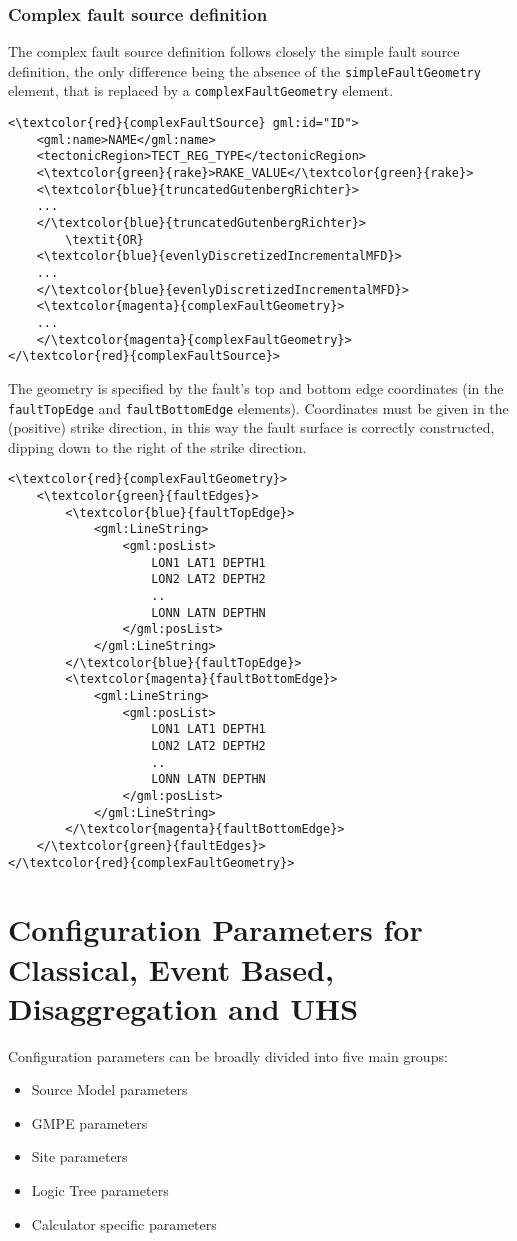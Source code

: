 \subsubsection{Complex fault source definition}
The complex fault source definition follows closely the simple fault source definition, the only difference being the absence of the \Verb+simpleFaultGeometry+ element, that is replaced by a \Verb+complexFaultGeometry+ element.
\begin{Verbatim}[frame=single, commandchars=\\\{\},fontsize=\normalsize, samepage=true]
<\textcolor{red}{complexFaultSource} gml:id="ID">
	<gml:name>NAME</gml:name>
	<tectonicRegion>TECT_REG_TYPE</tectonicRegion>
	<\textcolor{green}{rake}>RAKE_VALUE</\textcolor{green}{rake}>
	<\textcolor{blue}{truncatedGutenbergRichter}>
	...
	</\textcolor{blue}{truncatedGutenbergRichter}>
		\textit{OR}
	<\textcolor{blue}{evenlyDiscretizedIncrementalMFD}>
	...
	</\textcolor{blue}{evenlyDiscretizedIncrementalMFD}>
	<\textcolor{magenta}{complexFaultGeometry}>
	...
	</\textcolor{magenta}{complexFaultGeometry}>
</\textcolor{red}{complexFaultSource}>
\end{Verbatim}
The geometry is specified by the fault's top and bottom edge coordinates (in the \Verb+faultTopEdge+ and \Verb+faultBottomEdge+ elements). Coordinates must be given in the (positive) strike direction, in this way the fault surface is correctly constructed, dipping down to the right of the strike direction.
\begin{Verbatim}[frame=single, commandchars=\\\{\},fontsize=\normalsize, samepage=true]
<\textcolor{red}{complexFaultGeometry}>
	<\textcolor{green}{faultEdges}>
		<\textcolor{blue}{faultTopEdge}>
			<gml:LineString>
				<gml:posList>
					LON1 LAT1 DEPTH1
					LON2 LAT2 DEPTH2
					..
					LONN LATN DEPTHN
				</gml:posList>
			</gml:LineString>
		</\textcolor{blue}{faultTopEdge}>
		<\textcolor{magenta}{faultBottomEdge}>
			<gml:LineString>
				<gml:posList>
					LON1 LAT1 DEPTH1
					LON2 LAT2 DEPTH2
					..
					LONN LATN DEPTHN
				</gml:posList>
			</gml:LineString>
		</\textcolor{magenta}{faultBottomEdge}>
	</\textcolor{green}{faultEdges}>
</\textcolor{red}{complexFaultGeometry}>
\end{Verbatim}

\section{Configuration Parameters for Classical, Event Based, Disaggregation and UHS}
Configuration parameters can be broadly divided into five main groups:
\begin{itemize}
\item Source Model parameters
\item GMPE parameters
\item Site parameters
\item Logic Tree parameters
\item Calculator specific parameters
\end{itemize}

